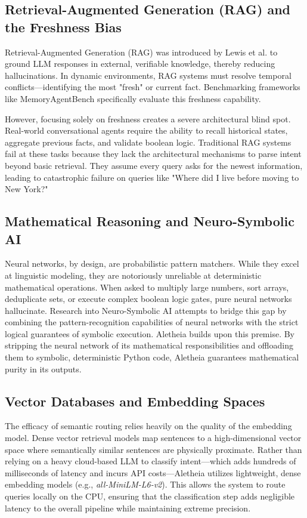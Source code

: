 \documentclass[journal,10pt]{IEEEtran}
\begin{document}
\subsection{Retrieval-Augmented Generation (RAG) and the Freshness Bias}
Retrieval-Augmented Generation (RAG) was introduced by Lewis et al. to ground LLM responses in external, verifiable knowledge, thereby reducing hallucinations. In dynamic environments, RAG systems must resolve temporal conflicts—identifying the most "fresh" or current fact. Benchmarking frameworks like MemoryAgentBench specifically evaluate this freshness capability. 

However, focusing solely on freshness creates a severe architectural blind spot. Real-world conversational agents require the ability to recall historical states, aggregate previous facts, and validate boolean logic. Traditional RAG systems fail at these tasks because they lack the architectural mechanisms to parse intent beyond basic retrieval. They assume every query asks for the newest information, leading to catastrophic failure on queries like "Where did I live before moving to New York?"

\subsection{Mathematical Reasoning and Neuro-Symbolic AI}
Neural networks, by design, are probabilistic pattern matchers. While they excel at linguistic modeling, they are notoriously unreliable at deterministic mathematical operations. When asked to multiply large numbers, sort arrays, deduplicate sets, or execute complex boolean logic gates, pure neural networks hallucinate. Research into Neuro-Symbolic AI attempts to bridge this gap by combining the pattern-recognition capabilities of neural networks with the strict logical guarantees of symbolic execution. Aletheia builds upon this premise. By stripping the neural network of its mathematical responsibilities and offloading them to symbolic, deterministic Python code, Aletheia guarantees mathematical purity in its outputs.

\subsection{Vector Databases and Embedding Spaces}
The efficacy of semantic routing relies heavily on the quality of the embedding model. Dense vector retrieval models map sentences to a high-dimensional vector space where semantically similar sentences are physically proximate. Rather than relying on a heavy cloud-based LLM to classify intent—which adds hundreds of milliseconds of latency and incurs API costs—Aletheia utilizes lightweight, dense embedding models (e.g., \textit{all-MiniLM-L6-v2}). This allows the system to route queries locally on the CPU, ensuring that the classification step adds negligible latency to the overall pipeline while maintaining extreme precision.
\end{document}

